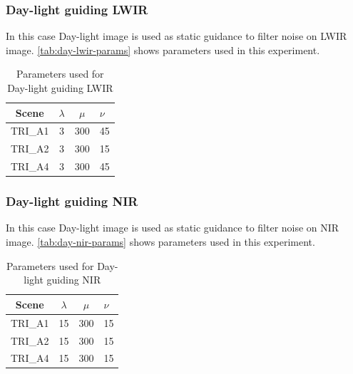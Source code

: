 \documentclass[10pt,twocolumn,letterpaper]{article}
\begin{document}
	\subsubsection{Day-light guiding LWIR}
	In this case Day-light image is used as static guidance to filter noise on LWIR image. \autoref{tab:day-lwir-params} shows parameters used in this experiment.
	\begin{table}[!ht]
		\centering
		\caption{Parameters used for Day-light guiding LWIR}
		\label{tab:day-lwir-params}
		\begin{tabular}{@{}cccl@{}}
			\toprule
			\bfseries Scene & \(\lambda\) & \(\mu\) & \(\nu\) \\ \midrule
			TRI\_A1               & 3        	& 300	  & 45       \\
			TRI\_A2               & 3        	& 300	  & 15       \\
			TRI\_A4               & 3        	& 300	  & 45       \\ \bottomrule
		\end{tabular}
	\end{table}
	\subsubsection{Day-light guiding NIR}
	In this case Day-light image is used as static guidance to filter noise on NIR image. \autoref{tab:day-nir-params} shows parameters used in this experiment.
	\begin{table}[!ht]
		\centering
		\caption{Parameters used for Day-light guiding NIR}
		\label{tab:day-nir-params}
		\begin{tabular}{@{}cccl@{}}
			\toprule
			\bfseries Scene & \(\lambda\) & \(\mu\) & \(\nu\) \\ \midrule
			TRI\_A1               & 15        	& 300	  & 15       \\
			TRI\_A2               & 15       	& 300	  & 15       \\
			TRI\_A4               & 15       	& 300	  & 15       \\ \bottomrule
		\end{tabular}
	\end{table}
\end{document}
